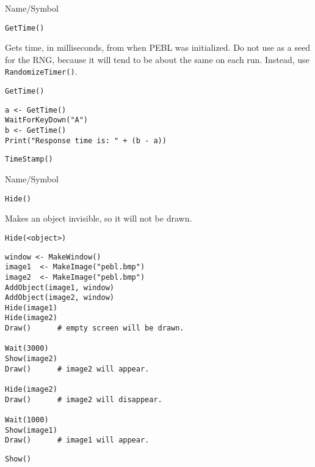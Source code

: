 \begin{desc}{Name/Symbol}
\item[Name/Symbol]	\verb+GetTime()+

\item[Description] Gets time, in milliseconds, from when PEBL was
  initialized.  Do not use as a seed for the RNG, because it will tend
  to be about the same on each run. Instead, use \verb+RandomizeTimer()+.

\item[Usage]
\begin{verbatim}
GetTime()
\end{verbatim}

\item[Example]
\begin{verbatim}
a <- GetTime()
WaitForKeyDown("A")
b <- GetTime()
Print("Response time is: " + (b - a))
\end{verbatim}

\item[See Also]	\verb+TimeStamp()+
\end{desc}

\vfill
\newpage
{}
\vfill


\begin{desc}{Name/Symbol}
\item[Name/Symbol]	\verb+Hide()+ 

\item[Description]	Makes an object invisible, so it will not be drawn.

\item[Usage]
\begin{verbatim}
Hide(<object>)
\end{verbatim}

\item[Example]
\begin{verbatim}
window <- MakeWindow()
image1  <- MakeImage("pebl.bmp")
image2  <- MakeImage("pebl.bmp")
AddObject(image1, window)
AddObject(image2, window)
Hide(image1)
Hide(image2)
Draw()		# empty screen will be drawn.
	
Wait(3000)
Show(image2)
Draw()		# image2 will appear.

Hide(image2)
Draw()		# image2 will disappear.

Wait(1000)
Show(image1)
Draw()		# image1 will appear.
\end{verbatim}
 
\item[See Also]	\verb+Show()+
\end{desc}

